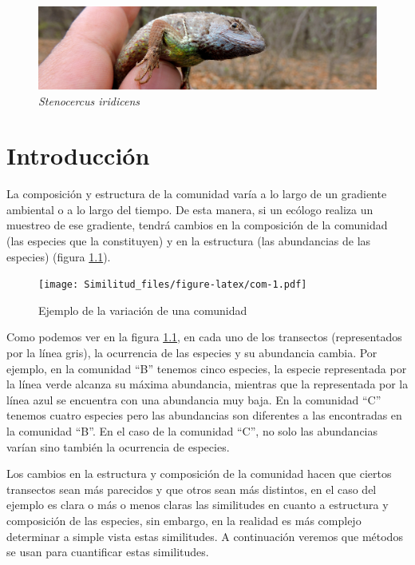 \documentclass[]{book}
\begin{document}
\begin{figure}[htbp]
\centering
\includegraphics{lagar.jpg}
\caption{\emph{Stenocercus iridicens}}
\end{figure}

\chapter{Introducción}\label{introduccion}

La composición y estructura de la comunidad varía a lo largo de un
gradiente ambiental o a lo largo del tiempo. De esta manera, si un
ecólogo realiza un muestreo de ese gradiente, tendrá cambios en la
composición de la comunidad (las especies que la constituyen) y en la
estructura (las abundancias de las especies) (figura \ref{fig:com}).

\begin{figure}[htbp]
\centering
\texttt{[image: Similitud\_files/figure-latex/com-1.pdf]}
\caption{\label{fig:com}Ejemplo de la variación de una comunidad}
\end{figure}

Como podemos ver en la figura \ref{fig:com}, en cada uno de los
transectos (representados por la línea gris), la ocurrencia de las
especies y su abundancia cambia. Por ejemplo, en la comunidad ``B''
tenemos cinco especies, la especie representada por la línea verde
alcanza su máxima abundancia, mientras que la representada por la línea
azul se encuentra con una abundancia muy baja. En la comunidad ``C''
tenemos cuatro especies pero las abundancias son diferentes a las
encontradas en la comunidad ``B''. En el caso de la comunidad ``C'', no
solo las abundancias varían sino también la ocurrencia de especies.

Los cambios en la estructura y composición de la comunidad hacen que
ciertos transectos sean más parecidos y que otros sean más distintos, en
el caso del ejemplo es clara o más o menos claras las similitudes en
cuanto a estructura y composición de las especies, sin embargo, en la
realidad es más complejo determinar a simple vista estas similitudes. A
continuación veremos que métodos se usan para cuantificar estas
similitudes.
\end{document}
